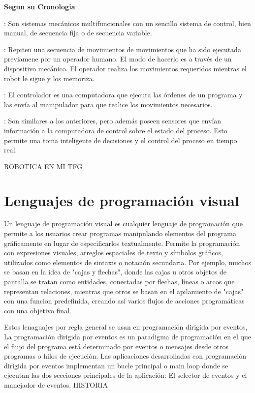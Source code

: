 \textbf{Segun su Cronologia}:
\begin{description}[align=left]
\item [1ª Generación. Manipuladores]: Son sistemas mecánicos multifuncionales con un sencillo sistema de control, bien manual, de secuencia fija o de secuencia variable.

\item [2ª Generación. Robots de aprendizaje]: Repiten una secuencia de movimientos de movimientos que ha sido ejecutada previamene por un operador humano. El modo de hacerlo es a través de un dispositivo mecánico. El operador realiza los movimientos requeridos mientras el robot le sigue y los memoriza.

\item [3ª Generación. Robots con control sensorizado]: El controlador es una computadora que ejecuta las órdenes de un programa y las envía al manipulador para que realice los movimientos necesarios.

\item [4ª Generación. Robots inteligentes]: Son similares a los anteriores, pero además poseen sensores que envían información a la computadora de control sobre el estado del proceso. Esto permite una toma inteligente de decisiones y el control del proceso en tiempo real.
\end{description}

ROBOTICA EN MI TFG


\section{Lenguajes de programación visual}
\label{sec:lenguajes}

Un lenguaje de programación visual es cualquier lenguaje de programación que permite a los usuarios crear programas manipulando elementos del programa gráficamente en lugar de especificarlos textualmente. Permite la programación con expresiones visuales, arreglos espaciales de texto y símbolos gráficos, utilizados como elementos de sintaxis o notación secundaria. Por ejemplo, muchos se basan en la idea de "cajas y flechas", donde las cajas u otros objetos de pantalla se tratan como entidades, conectadas por flechas, líneas o arcos que representan relaciones, mientras que otros se basan en el apilamiento de "cajas" con una funcion predefinida, creando así varios flujos de acciones programáticas con una objetivo final.

Estos lenaguajes por regla general se usan en programación dirigida por eventos, La programación dirigida por eventos es un paradigma de programación en el que el flujo del programa está determinado por eventos o mensajes desde otros programas o hilos de ejecución.
Las aplicaciones desarrolladas con programación dirigida por eventos implementan un bucle principal o main loop donde se ejecutan las dos secciones principales de la aplicación: El selector de eventos y el manejador de eventos.
HISTORIA

